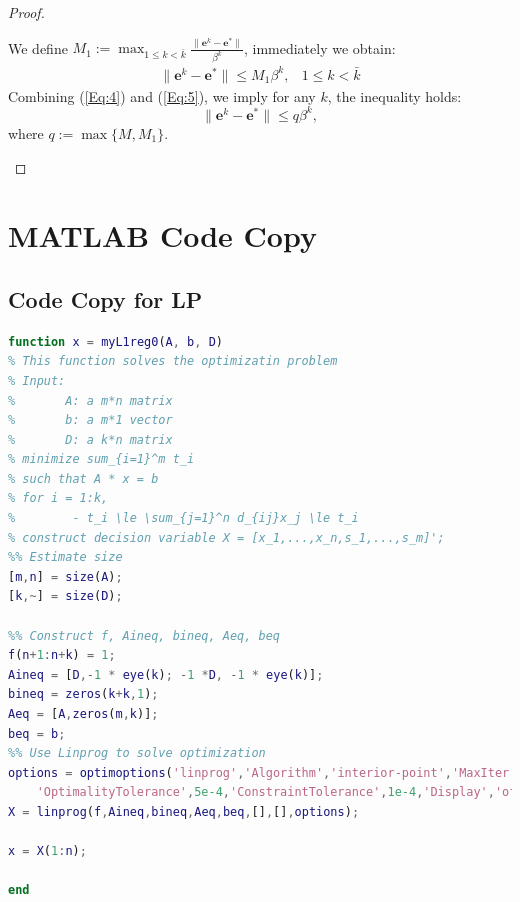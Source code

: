 \begin{enumerate}
\begin{proof}
\begin{itemize}
We define $M_1:=\max_{1\le k<\bar k}\frac{\|\bm e^k-\bm e^*\|}{\beta^k}$, immediately we obtain:
\begin{equation}\label{Eq:5}
\begin{array}{ll}
\|\bm e^k-\bm e^*\|\le M_1\beta^k,
&
1\le k<\bar k
\end{array}
\end{equation}
Combining (\ref{Eq:4}) and (\ref{Eq:5}), we imply for any $k$, the inequality holds:
\[
\|\bm e^k-\bm e^*\|\le q\beta^k,
\]
where $q:=\max\{M,M_1\}$.
\end{itemize}



\end{proof}













\end{enumerate}

\clearpage
\section*{MATLAB Code Copy}
\subsection*{Code Copy for LP}
\begin{lstlisting}[language=matlab]
function x = myL1reg0(A, b, D)
% This function solves the optimizatin problem
% Input:
%       A: a m*n matrix
%       b: a m*1 vector
%       D: a k*n matrix
% minimize sum_{i=1}^m t_i
% such that A * x = b
% for i = 1:k,
%        - t_i \le \sum_{j=1}^n d_{ij}x_j \le t_i
% construct decision variable X = [x_1,...,x_n,s_1,...,s_m]';
%% Estimate size
[m,n] = size(A);
[k,~] = size(D);

%% Construct f, Aineq, bineq, Aeq, beq
f(n+1:n+k) = 1;
Aineq = [D,-1 * eye(k); -1 *D, -1 * eye(k)];
bineq = zeros(k+k,1);
Aeq = [A,zeros(m,k)];
beq = b;
%% Use Linprog to solve optimization
options = optimoptions('linprog','Algorithm','interior-point','MaxIter',20,...
    'OptimalityTolerance',5e-4,'ConstraintTolerance',1e-4,'Display','off');
X = linprog(f,Aineq,bineq,Aeq,beq,[],[],options);

x = X(1:n);

end 
\end{lstlisting}
